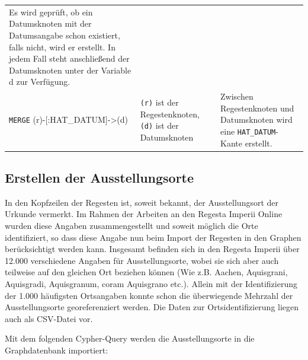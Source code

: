 \documentclass[ngerman,]{scrreprt}
\begin{document}
\begin{longtable}[]{@{}lll@{}}
\begin{minipage}[t]{0.37\columnwidth}
Es wird geprüft, ob ein Datumsknoten mit der Datumsangabe schon existiert, falls nicht, wird er erstellt. In jedem Fall steht anschließend der Datumsknoten unter der Variable d zur Verfügung.\strut
\end{minipage}\tabularnewline
\begin{minipage}[t]{0.31\columnwidth}\raggedright
\texttt{MERGE} (r)-{[}:HAT\_DATUM{]}-\textgreater{}(d)\strut
\end{minipage} & \begin{minipage}[t]{0.23\columnwidth}\raggedright
\texttt{(r)} ist der Regestenknoten, \texttt{(d)} ist der Datumsknoten\strut
\end{minipage} & \begin{minipage}[t]{0.37\columnwidth}\raggedright
Zwischen Regestenknoten und Datumsknoten wird eine \texttt{HAT\_DATUM}-Kante erstellt.\strut
\end{minipage}\tabularnewline
\bottomrule
\end{longtable}

\hypertarget{erstellen-der-ausstellungsorte}{%
\subsection{Erstellen der Ausstellungsorte}\label{erstellen-der-ausstellungsorte}}

In den Kopfzeilen der Regesten ist, soweit bekannt, der Ausstellungsort der Urkunde vermerkt. Im Rahmen der Arbeiten an den Regesta Imperii Online wurden diese Angaben zusammengestellt und soweit möglich die Orte identifiziert, so dass diese Angabe nun beim Import der Regesten in den Graphen berücksichtigt werden kann. Insgesamt befinden sich in den Regesta Imperii über 12.000 verschiedene Angaben für Ausstellungsorte, wobei sie sich aber auch teilweise auf den gleichen Ort beziehen können (Wie z.B. Aachen, Aquisgrani, Aquisgradi, Aquisgranum, coram Aquisgrano etc.). Allein mit der Identifizierung der 1.000 häufigsten Ortsangaben konnte schon die überwiegende Mehrzahl der Ausstellungsorte georeferenziert werden. Die Daten zur Ortsidentifizierung liegen auch als CSV-Datei vor.

Mit dem folgenden Cypher-Query werden die Ausstellungsorte in die Graphdatenbank importiert:
\end{document}
